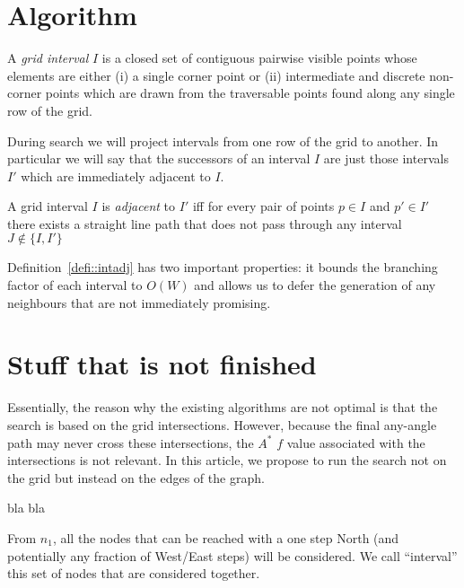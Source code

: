 \section{Algorithm}

\begin{defi}
\label{defi::interval}
A \emph{grid interval} $I$ is a closed set of contiguous pairwise
visible points whose elements are either (i) a single corner 
point or (ii) intermediate and discrete non-corner points 
which are drawn from the traversable points found along any 
single row of the grid.
\end{defi}
During search we will project intervals from one row of the grid to another.
In particular we will say that the successors of an interval $I$
are just those intervals $I'$ which are immediately adjacent
to $I$.
\begin{defi}
\label{defi::intadj}
A grid interval $I$ is \emph{adjacent} to $I'$ iff for every pair 
of points $p \in I$ and $p' \in I'$ there exists a straight line
path that does not pass through any interval 
$J \not \in \lbrace I, I' \rbrace$
\end{defi}
Definition~\ref{defi::intadj} has two important properties: it bounds 
the branching factor of each interval to $O(W)$ and allows us to defer 
the generation of any neighbours that are not immediately promising.

\section{Stuff that is not finished}

Essentially, the reason why the existing algorithms are not optimal
is that the search is based on the grid intersections.  
However, because the final any-angle path 
may never cross these intersections, 
the $A^*$ $f$ value associated with the intersections
is not relevant.  
In this article, we propose to run the search not on the grid 
but instead on the edges of the graph.  

bla bla

From $n_1$, all the nodes that can be reached with a one step North 
(and potentially any fraction of West/East steps) will be considered.  
We call ``interval'' this set of nodes that are considered together.  

